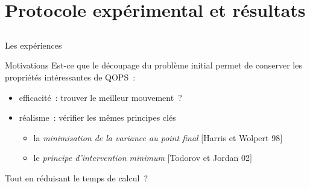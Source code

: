 \section{Protocole expérimental et résultats}



%        


\subsection{}

\begin{frame}{Les expériences}
    \begin{block}{Motivations}
        Est-ce que le découpage du problème initial permet de conserver les propriétés intéressantes de QOPS~:
        \begin{itemize}
            \item efficacité~: trouver le \og{}meilleur\fg{} mouvement~?
            \item réalisme~: vérifier les mêmes principes clés
            \begin{itemize}
                \item la {\em minimisation de la variance au point final} $[$Harris et Wolpert 98$]$
                \item le {\em principe d'intervention minimum} $[$Todorov et Jordan 02$]$
            \end{itemize}
        \end{itemize}
    \end{block}
    Tout en réduisant le temps de calcul~?
\end{frame}

